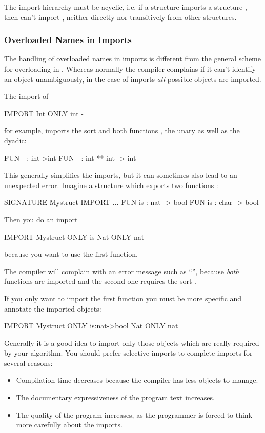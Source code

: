 \important The import hierarchy must be acyclic, i.e. if a structure
 imports a
structure , then  can't import
, neither directly nor transitively from other structures.


\subsubsection{Overloaded Names in Imports}
\novice
The handling of overloaded names in imports is different from the
general scheme for overloading in \opal.
Whereas normally the compiler complains if it can't identify an object
unambiguously, in the case of imports {\em all\/} possible objects are
imported.

The import of
\begin{prog}
         IMPORT Int ONLY int -
\end{prog}
for example, imports the sort  and both functions \pro{-},
the unary as well as the dyadic:
\begin{prog}
         FUN - : int->int
         FUN - : int ** int -> int
\end{prog}

This generally simplifies the imports, but it can  sometimes also lead to an
unexpected error.
Imagine a structure which exports two functions :
\begin{prog}
          SIGNATURE Mystruct
          IMPORT ...
          FUN is : nat -> bool
          FUN is : char -> bool
\end{prog}
Then you do an import
\begin{prog}
          IMPORT Mystruct ONLY is
                 Nat      ONLY nat
\end{prog}
because you want to use the first function.

The compiler will complain with an error message such as ``'', because {\em both\/} functions are imported and the second
one requires the sort .

If you only want to import the first function you must be more
specific and annotate the imported objects:
\begin{prog}
          IMPORT Mystruct   ONLY is:nat->bool
                 Nat        ONLY nat
\end{prog}

\bigskip
\novice Generally it is a good idea to import only those objects which are
really required by your algorithm.
You should prefer selective imports to complete imports for
several reasons: 
\begin{itemize}
\item Compilation time decreases because the compiler has less
  objects to manage.
\item The documentary expressiveness of the program text increases.
\item The quality of the program increases, as the programmer is
  forced to think more carefully about the imports.
\end{itemize}

